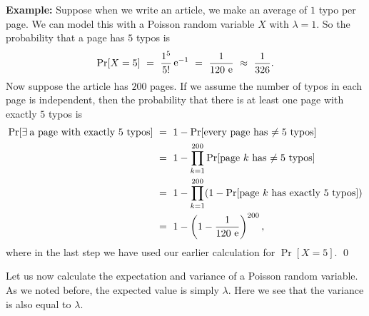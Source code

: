 \documentclass[11pt]{article}
\begin{document}
\smallskip

{\bf Example:} Suppose when we write an article, we make an average of $1$ typo per page. We can model this with a Poisson random variable $X$ with $\lambda = 1$. So the probability that a page has $5$ typos is
$$\Pr[X = 5] ~=~ \frac{1^5}{5!} \mathop{\mathrm{e}}\nolimits^{-1} ~=~ \frac{1}{120 \, \mathop{\mathrm{e}}\nolimits} ~\approx~ \frac{1}{326}.$$
Now suppose the article has $200$ pages. If we assume the number of typos in each page is independent, then the probability that there is at least one page with exactly $5$ typos is
\begin{align*}
\Pr[\exists \: \text{a page with exactly $5$ typos}]
~&=~ 1 - \Pr[\text{every page has $\neq 5$ typos}] \\
~&=~ 1 - \prod_{k=1}^{200} \Pr[\text{page $k$ has $\neq 5$ typos}] \\
~&=~ 1 - \prod_{k=1}^{200} (1 - \Pr[\text{page $k$ has exactly $5$ typos}]) \\
~&=~ 1 - \left(1 - \frac{1}{120 \, \mathop{\mathrm{e}}\nolimits}\right)^{200},
\end{align*}
where in the last step we have used our earlier calculation for $\Pr[X = 5]$. \qed


\medskip

Let us now calculate the expectation and variance of a Poisson random variable. As we noted before, the expected value is simply $\lambda$. Here we see that the variance is also equal to $\lambda$.
\end{document}
